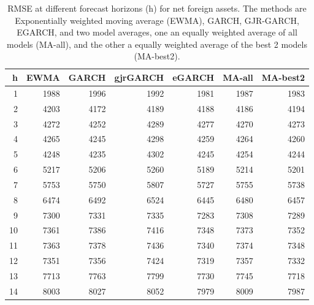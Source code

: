 \begin{table}[ht]
\centering
\begin{tabular}{rrrrrrr}
  \hline
h & EWMA & GARCH & gjrGARCH & eGARCH & MA-all & MA-best2 \\ 
  \hline
1 & 1988 & 1996 & 1992 & 1981 & 1987 & 1983 \\ 
  2 & 4203 & 4172 & 4189 & 4188 & 4186 & 4194 \\ 
  3 & 4272 & 4252 & 4289 & 4277 & 4270 & 4273 \\ 
  4 & 4265 & 4245 & 4298 & 4259 & 4264 & 4260 \\ 
  5 & 4248 & 4235 & 4302 & 4245 & 4254 & 4244 \\ 
  6 & 5217 & 5206 & 5260 & 5189 & 5214 & 5201 \\ 
  7 & 5753 & 5750 & 5807 & 5727 & 5755 & 5738 \\ 
  8 & 6474 & 6492 & 6524 & 6445 & 6480 & 6457 \\ 
  9 & 7300 & 7331 & 7335 & 7283 & 7308 & 7289 \\ 
  10 & 7361 & 7386 & 7416 & 7348 & 7373 & 7352 \\ 
  11 & 7363 & 7378 & 7436 & 7340 & 7374 & 7348 \\ 
  12 & 7351 & 7356 & 7424 & 7319 & 7357 & 7332 \\ 
  13 & 7713 & 7763 & 7799 & 7730 & 7745 & 7718 \\ 
  14 & 8003 & 8027 & 8052 & 7979 & 8009 & 7987 \\ 
   \hline
\end{tabular}
\caption{RMSE at different forecast horizons (h) for net foreign assets. The methods are Exponentially weighted moving average (EWMA), GARCH, GJR-GARCH, EGARCH, and two model averages, one an equally weighted average of all models (MA-all), and the other a equally weighted average of the best 2 models (MA-best2).} 
\label{tab:rmsenfa}
\end{table}


